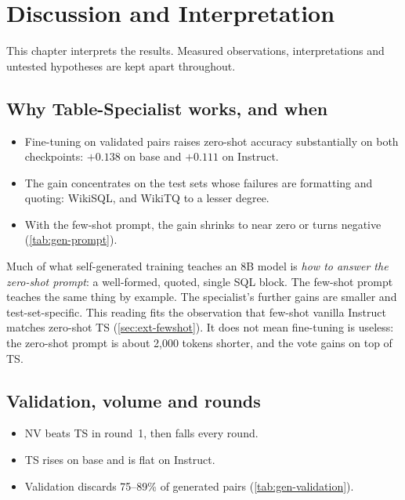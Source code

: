 \chapter{Discussion and Interpretation}\label{ch:discussion}

This chapter interprets the results. Measured observations, interpretations and untested hypotheses are kept apart
throughout.

\section{Why Table-Specialist works, and when}

\begin{observation}
\begin{itemize}
\item Fine-tuning on validated pairs raises zero-shot accuracy substantially on both checkpoints: \ZSiv{} $+0.138$ on
base and $+0.111$ on Instruct.
\item The gain concentrates on the test sets whose failures are formatting and quoting: WikiSQL, and WikiTQ to a lesser
degree.
\item With the few-shot prompt, the gain shrinks to near zero or turns negative (\cref{tab:gen-prompt}).
\end{itemize}
\end{observation}

\begin{interpretation}
Much of what self-generated training teaches an 8B model is \emph{how to answer the zero-shot prompt}: a well-formed,
quoted, single SQL block. The few-shot prompt teaches the same thing by example. The specialist's further gains are
smaller and test-set-specific. This reading fits the observation that few-shot vanilla Instruct matches zero-shot TS
(\cref{sec:ext-fewshot}). It does not mean fine-tuning is useless: the zero-shot prompt is about 2,000 tokens shorter,
and the vote gains on top of TS.
\end{interpretation}

\section{Validation, volume and rounds}

\begin{observation}
\begin{itemize}
\item NV beats TS in round~1, then falls every round.
\item TS rises on base and is flat on Instruct.
\item Validation discards 75--89\% of generated pairs (\cref{tab:gen-validation}).
\end{itemize}
\end{observation}

